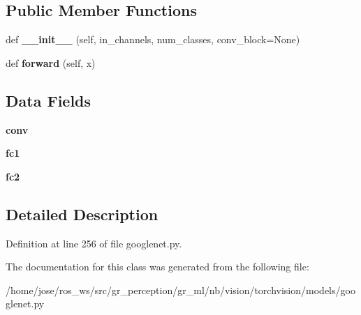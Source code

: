 \subsection*{Public Member Functions}
\begin{DoxyCompactItemize}
\item 
\mbox{\label{classtorchvision_1_1models_1_1googlenet_1_1InceptionAux_aa81be09b8da3e3881e7cef01195126bd}} 
def {\bfseries \+\_\+\+\_\+init\+\_\+\+\_\+} (self, in\+\_\+channels, num\+\_\+classes, conv\+\_\+block=None)
\item 
\mbox{\label{classtorchvision_1_1models_1_1googlenet_1_1InceptionAux_a35341f5a63a754a2040d98fbc404d0dc}} 
def {\bfseries forward} (self, x)
\end{DoxyCompactItemize}
\subsection*{Data Fields}
\begin{DoxyCompactItemize}
\item 
\mbox{\label{classtorchvision_1_1models_1_1googlenet_1_1InceptionAux_ac20b2aed47161fa3637e4e37cf5efe24}} 
{\bfseries conv}
\item 
\mbox{\label{classtorchvision_1_1models_1_1googlenet_1_1InceptionAux_a16df71c3ed8b59bc7d9774391bf1c893}} 
{\bfseries fc1}
\item 
\mbox{\label{classtorchvision_1_1models_1_1googlenet_1_1InceptionAux_aec5b77de5a7591ac720cf760dbf6d7bf}} 
{\bfseries fc2}
\end{DoxyCompactItemize}


\subsection{Detailed Description}


Definition at line 256 of file googlenet.\+py.



The documentation for this class was generated from the following file\+:\begin{DoxyCompactItemize}
\item 
/home/jose/ros\+\_\+ws/src/gr\+\_\+perception/gr\+\_\+ml/nb/vision/torchvision/models/googlenet.\+py\end{DoxyCompactItemize}
